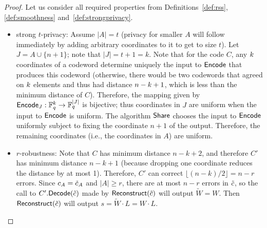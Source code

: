 \begin{proof}
Let us consider all required properties from Definitions~\ref{def:rss}, \ref{def:smoothness} and~\ref{def:strongprivacy}.
\begin{itemize}

\item strong $t$-privacy: Assume $|A| = t$ (privacy for smaller $A$ will follow immediately by adding arbitrary coordinates to it to get to size $t$). Let $J = A\cup\{n+1\}$; note that $|J|=t+1=k$. Note that for the code $C$, any $k$ coordinates of a codeword determine uniquely the input to $\mathsf{Encode}$ that produces this codeword (otherwise, there would be two codewords that agreed on $k$ elements and thus had distance $n-k+1$, which is less than the minimum distance of $C$).  Therefore, the mapping  given by $\mathsf{Encode}_J: \mathbb{F}_q^{k}\to\mathbb{F}_q^{|J|}$ is bijective; thus coordinates in $J$ are uniform when the input to $\mathsf{Encode}$ is uniform. The algorithm $\mathsf{Share}$ chooses the input to $\mathsf{Encode}$ uniformly subject to fixing the coordinate $n+1$ of the output. Therefore, the remaining coordinates (i.e., the coordinates in $A$) are uniform.
\item $r$-robustness: Note that $C$ has minimum distance $n-k+2$, and therefore $C'$ has minimum distance $n-k+1$ (because dropping one coordinate reduces the distance by at most 1). Therefore, $C'$ can correct $\lfloor (n-k)/2\rfloor = n-r$ errors. Since $c_A = \tilde{c}_A$ and $|A| \ge r$, there are at most $n-r$ errors in $\tilde{c}$, so the call to $C'.\mathsf{Decode}(\tilde{c})$ made by $\mathsf{Reconstruct}(\tilde{c})$ will output $\tilde{W}=W$. Then $\mathsf{Reconstruct}(\tilde{c})$ will output $s = \tilde{W}\cdot L = W\cdot L$.

\end{itemize}
\end{proof}
